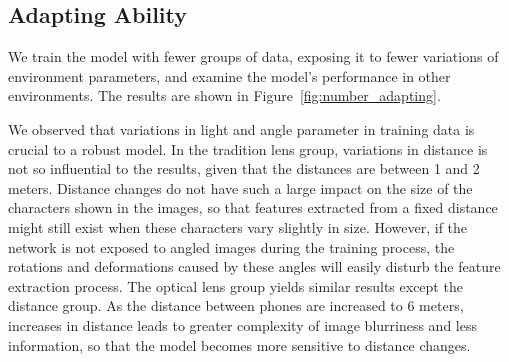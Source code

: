 \subsection{Adapting Ability}
We train the model with fewer groups of data, exposing it to fewer variations of environment parameters, and examine the model's performance in other environments. The results are shown in Figure~\ref{fig:number_adapting}.

We observed that variations in light and angle parameter in training data is crucial to a robust model. In the tradition lens group, variations in distance is not so influential to the results, given that the distances are between 1 and 2 meters. Distance changes do not have such a large impact on the size of the characters shown in the images, so that features extracted from a fixed distance might still exist when these characters vary slightly in size. However, if the network is not exposed to angled images during the training process, the rotations and deformations caused by these angles will easily disturb the feature extraction process. The optical lens group yields similar results except the distance group. As the distance between phones are increased to 6 meters, increases in distance leads to greater complexity of image blurriness and less information, so that the model becomes more sensitive to distance changes.

